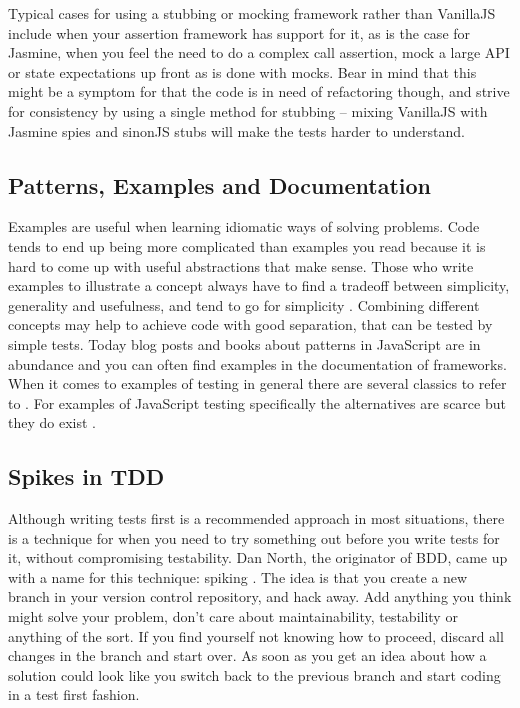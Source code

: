 \documentclass[11pt]{article}
\begin{document}
Typical cases for using a stubbing or mocking framework rather than VanillaJS include when your assertion framework has support for it, as is the case for Jasmine, when you feel the need to do a complex call assertion, mock a large API or state expectations up front as is done with mocks. Bear in mind that this might be a symptom for that the code is in need of refactoring though, and strive for consistency by using a single method for stubbing -- mixing VanillaJS with Jasmine spies and sinonJS stubs will make the tests harder to understand.

\subsection{Patterns, Examples and Documentation}

Examples are useful when learning idiomatic ways of solving problems. Code tends to end up being more complicated than examples you read because it is hard to come up with useful abstractions that make sense. Those who write examples to illustrate a concept always have to find a tradeoff between simplicity, generality and usefulness, and tend to go for simplicity \cite[questions~56-57]{Edelstam}. Combining different concepts may help to achieve code with good separation, that can be tested by simple tests. Today blog posts and books about patterns in JavaScript are in abundance and you can often find examples in the documentation of frameworks. When it comes to examples of testing in general there are several classics to refer to \cite{KentBeck}\cite{TestPatterns}. For examples of JavaScript testing specifically the alternatives are scarce but they do exist \cite{Tddjs}\cite{BDDJS}\cite{TestableJS}.

\subsection{Spikes in TDD}

Although writing tests first is a recommended approach in most situations, there is a technique for when you need to try something out before you write tests for it, without compromising testability. Dan North, the originator of BDD, came up with a name for this technique: spiking \cite{TwitterDanNorth}. The idea is that you create a new branch in your version control repository, and hack away. Add anything you think might solve your problem, don't care about maintainability, testability or anything of the sort. If you find yourself not knowing how to proceed, discard all changes in the branch and start over. As soon as you get an idea about how a solution could look like you switch back to the previous branch and start coding in a test first fashion. \cite[question~59]{Edelstam}
\end{document}
